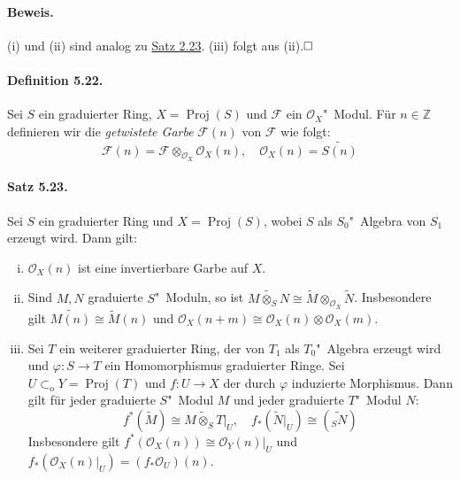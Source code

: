 \documentclass[11pt,b5paper,openany]{memoir}
\def \qed {$\hfill\square$}
\begin{document}
\paragraph{Beweis.} (i) und (ii) sind analog zu \hyperref[2.23]{Satz 2.23}. (iii) folgt aus (ii).\qed

\paragraph{Definition 5.22.}\label{5.22} Sei $S$ ein graduierter Ring, $X=\operatorname{Proj}(S)$ und $\mathcal{F}$ ein $\mathcal{O}_X$"~Modul. Für $n\in\mathbb{Z}$ definieren wir die \textit{getwistete Garbe} $\mathcal{F}(n)$ von $\mathcal{F}$ wie folgt:
\[\mathcal{F}(n)=\mathcal{F}\otimes_{\mathcal{O}_X}\mathcal{O}_X(n),\quad \mathcal{O}_X(n)=\widetilde{S(n)} \]

\paragraph{Satz 5.23.}\label{5.23} Sei $S$ ein graduierter Ring und $X=\operatorname{Proj}(S)$, wobei $S$ als $S_0$"~Algebra von $S_1$ erzeugt wird. Dann gilt:
\begin{enumerate}[(i)]
\item $\mathcal{O}_X(n)$ ist eine invertierbare Garbe auf $X$.
\item Sind $M,N$ graduierte $S$"~Moduln, so ist $\widetilde{M\otimes_SN}\cong\widetilde{M}\otimes_{\mathcal{O}_X}\widetilde{N}$. Insbesondere gilt $\widetilde{M(n)}\cong\widetilde{M}(n)$ und $\mathcal{O}_X(n+m)\cong\mathcal{O}_X(n)\otimes\mathcal{O}_X(m)$.
\item Sei $T$ ein weiterer graduierter Ring, der von $T_1$ als $T_0$"~Algebra erzeugt wird und $\varphi:S\to T$ ein Homomorphismus graduierter Ringe. Sei $U\subset_\text{o} Y=\operatorname{Proj}(T)$ und $f:U\to X$ der durch $\varphi$ induzierte Morphismus. Dann gilt für jeder graduierte $S$"~Modul $M$ und jeder graduierte $T$"~Modul $N$:
\[f^\ast(\widetilde{M})\cong\widetilde{M\otimes_ST}|_U,\quad f_\ast(\widetilde{N}|_U)\cong (\widetilde{_SN}) \]
Insbesondere gilt $f^\ast(\mathcal{O}_X(n))\cong\mathcal{O}_Y(n)|_U$ und $f_\ast(\mathcal{O}_X(n)|_U)=(f_\ast\mathcal{O}_U)(n)$.
\end{enumerate}
\end{document}
